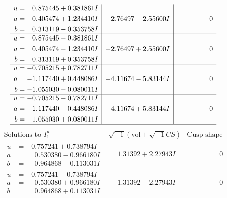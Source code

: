\documentclass[1p]{elsarticle_modified}
\theoremstyle{definition}
\newcommand{\I}{\sqrt{-1}}
\begin{document}
$$\begin{array}{c|c|c}
\begin{aligned}
u &= \phantom{-}0.875445 + 0.381861 I \\
a &= \phantom{-}0.405474 + 1.234410 I \\
b &= \phantom{-}0.313119 - 0.353758 I\end{aligned}
 & -2.76497 - 2.55600 I & \phantom{-0.000000 } 0 \\ \hline\begin{aligned}
u &= \phantom{-}0.875445 - 0.381861 I \\
a &= \phantom{-}0.405474 - 1.234410 I \\
b &= \phantom{-}0.313119 + 0.353758 I\end{aligned}
 & -2.76497 + 2.55600 I & \phantom{-0.000000 } 0 \\ \hline\begin{aligned}
u &= -0.705215 + 0.782711 I \\
a &= -1.117440 + 0.448086 I \\
b &= -1.055030 - 0.080011 I\end{aligned}
 & -4.11674 - 5.83144 I & \phantom{-0.000000 } 0 \\ \hline\begin{aligned}
u &= -0.705215 - 0.782711 I \\
a &= -1.117440 - 0.448086 I \\
b &= -1.055030 + 0.080011 I\end{aligned}
 & -4.11674 + 5.83144 I & \phantom{-0.000000 } 0\\
 \hline 
 \end{array}$$\newpage$$\begin{array}{c|c|c}  
\text{Solutions to }I^u_{1}& \I (\text{vol} + \sqrt{-1}CS) & \text{Cusp shape}\\
 \hline 
\begin{aligned}
u &= -0.757241 + 0.738794 I \\
a &= \phantom{-}0.530380 - 0.966180 I \\
b &= \phantom{-}0.964868 - 0.113031 I\end{aligned}
 & \phantom{-}1.31392 + 2.27943 I & \phantom{-0.000000 } 0 \\ \hline\begin{aligned}
u &= -0.757241 - 0.738794 I \\
a &= \phantom{-}0.530380 + 0.966180 I \\
b &= \phantom{-}0.964868 + 0.113031 I\end{aligned}
 & \phantom{-}1.31392 - 2.27943 I & \phantom{-0.000000 } 0 \\ \hline\begin{aligned}

\end{aligned}
\end{array}$$
\end{document}
